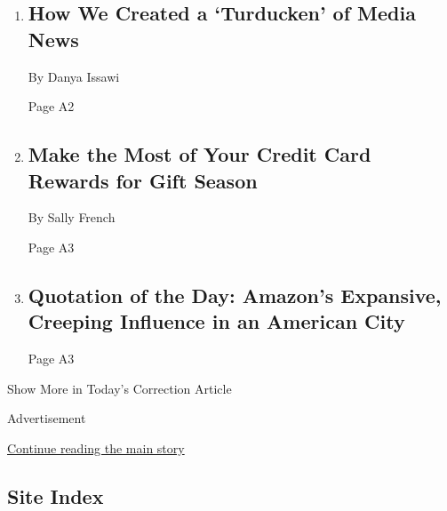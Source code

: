 \begin{enumerate}
\def\labelenumi{\arabic{enumi}.}
\item
  \href{/2019/11/30/reader-center/streaming-special-section.html}{}

  \hypertarget{how-we-created-a-turducken-of-media-news}{%
  \subsection{How We Created a `Turducken' of Media
  News}\label{how-we-created-a-turducken-of-media-news}}

  By Danya Issawi

  Page A2
\item
  \href{/2019/11/08/smarter-living/wirecutter/make-the-most-of-your-credit-card-rewards-for-gift-season.html}{}

  \hypertarget{make-the-most-of-your-credit-card-rewards-for-gift-season}{%
  \subsection{Make the Most of Your Credit Card Rewards for Gift
  Season}\label{make-the-most-of-your-credit-card-rewards-for-gift-season}}

  By Sally French

  Page A3
\item
  \href{/2019/12/01/todayspaper/quotation-of-the-day-amazons-expansive-creeping-influence-in-an-american-city.html}{}

  \hypertarget{quotation-of-the-day-amazons-expansive-creeping-influence-in-an-american-city}{%
  \subsection{Quotation of the Day: Amazon's Expansive, Creeping
  Influence in an American
  City}\label{quotation-of-the-day-amazons-expansive-creeping-influence-in-an-american-city}}

  Page A3
\end{enumerate}

Show More in Today's Correction Article

Advertisement

\protect\hyperlink{after-mid9}{Continue reading the main story}

\hypertarget{site-index}{%
\subsection{Site Index}\label{site-index}}

